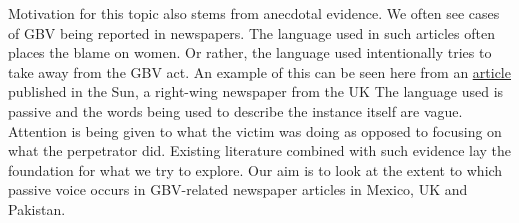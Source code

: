 \documentclass{article}
\begin{document}
{{Motivation for this topic also stems from anecdotal evidence. We often see cases of GBV being reported in newspapers. The language used in such articles often places the blame on women. Or rather, the language used intentionally tries to take away from the GBV act. An example of this can be seen here from an
\textcolor{blue}{\href{https://twitter.com/TheSun/status/755867885910851584}{\underline{article}}} published in the Sun, a right-wing newspaper from the UK
The language used is passive and the words being used to describe the instance itself are vague. Attention is being given to what the victim was doing as opposed to focusing on what the perpetrator did. Existing literature combined with such evidence lay the foundation for what we try to explore. Our aim is to look at the extent to which passive voice occurs in GBV-related newspaper articles in Mexico, UK and Pakistan.

}

}
\newpage
\end{document}
